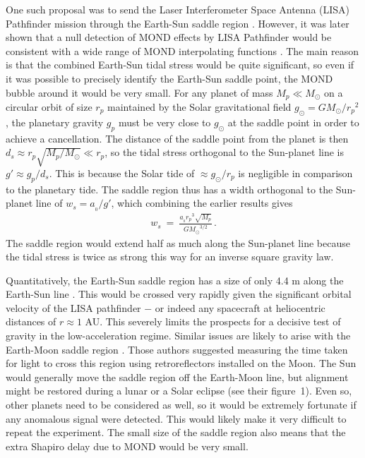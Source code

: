 \documentclass[fleqn,usenatbib,useAMS,onecolumn]{mnras} %
\begin{document}
One such proposal was to send the Laser Interferometer Space Antenna (LISA) Pathfinder mission \citep{Armano_2015} through the Earth-Sun saddle region \citep{Bevis_2010, Magueijo_2012}. However, it was later shown that a null detection of MOND effects by LISA Pathfinder would be consistent with a wide range of MOND interpolating functions \citep{Galianni_2012, Hees_2016}. The main reason is that the combined Earth-Sun tidal stress would be quite significant, so even if it was possible to precisely identify the Earth-Sun saddle point, the MOND bubble around it would be very small. For any planet of mass $M_p \ll M_\odot$ on a circular orbit of size $r_p$ maintained by the Solar gravitational field $g_\odot = GM_\odot/{r_p}^2$, the planetary gravity $g_p$ must be very close to $g_\odot$ at the saddle point in order to achieve a cancellation. The distance of the saddle point from the planet is then $d_s \approx r_p \sqrt{M_p/M_\odot} \ll r_p$, so the tidal stress orthogonal to the Sun-planet line is $g' \approx g_p/d_s$. This is because the Solar tide of $\approx g_\odot/r_p$ is negligible in comparison to the planetary tide. The saddle region thus has a width orthogonal to the Sun-planet line of $w_s = a_{_0}/g'$, which combining the earlier results gives
\begin{eqnarray}
    w_s ~=~ \frac{a_{_0}{r_p}^3\sqrt{M_p}}{G{M_\odot}^{3/2}} \, .
    \label{w_s}
\end{eqnarray}
The saddle region would extend half as much along the Sun-planet line because the tidal stress is twice as strong this way for an inverse square gravity law.

Quantitatively, the Earth-Sun saddle region has a size of only 4.4 m along the Earth-Sun line \citep{Penner_2020}. This would be crossed very rapidly given the significant orbital velocity of the LISA pathfinder $-$ or indeed any spacecraft at heliocentric distances of $r \approx 1$ AU. This severely limits the prospects for a decisive test of gravity in the low-acceleration regime. Similar issues are likely to arise with the Earth-Moon saddle region \citep{Magueijo_2013}. Those authors suggested measuring the time taken for light to cross this region using retroreflectors installed on the Moon. The Sun would generally move the saddle region off the Earth-Moon line, but alignment might be restored during a lunar or a Solar eclipse (see their figure~1). Even so, other planets need to be considered as well, so it would be extremely fortunate if any anomalous signal were detected. This would likely make it very difficult to repeat the experiment. The small size of the saddle region also means that the extra Shapiro delay due to MOND would be very small.
\end{document}
